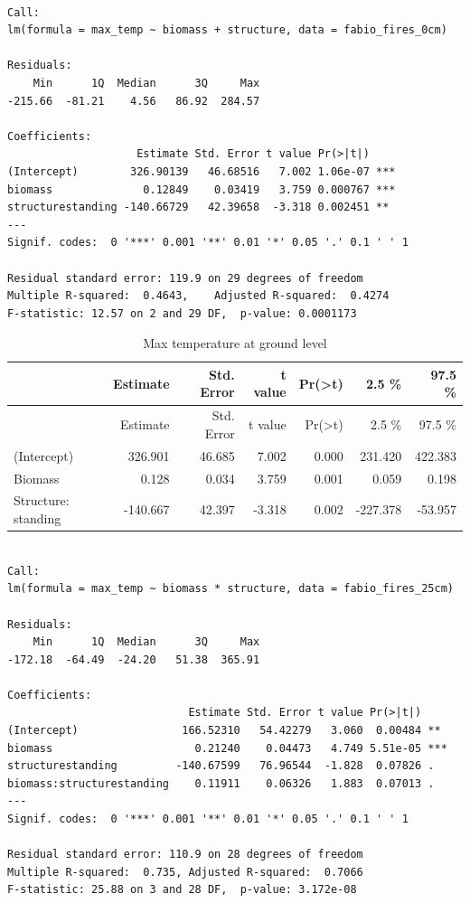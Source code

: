 \documentclass[11pt,a4paper]{article}
\begin{document}
\begin{verbatim}

Call:
lm(formula = max_temp ~ biomass + structure, data = fabio_fires_0cm)

Residuals:
    Min      1Q  Median      3Q     Max 
-215.66  -81.21    4.56   86.92  284.57 

Coefficients:
                    Estimate Std. Error t value Pr(>|t|)    
(Intercept)        326.90139   46.68516   7.002 1.06e-07 ***
biomass              0.12849    0.03419   3.759 0.000767 ***
structurestanding -140.66729   42.39658  -3.318 0.002451 ** 
---
Signif. codes:  0 '***' 0.001 '**' 0.01 '*' 0.05 '.' 0.1 ' ' 1

Residual standard error: 119.9 on 29 degrees of freedom
Multiple R-squared:  0.4643,    Adjusted R-squared:  0.4274 
F-statistic: 12.57 on 2 and 29 DF,  p-value: 0.0001173
\end{verbatim}

\begin{longtable}[]{@{}lrrrrrr@{}}
\caption{Max temperature at ground level}\tabularnewline
\toprule
& Estimate & Std. Error & t value &
Pr(\textgreater{}\textbar{}t\textbar{}) & 2.5 \% & 97.5
\%\tabularnewline
\midrule
\endfirsthead
\toprule
& Estimate & Std. Error & t value &
Pr(\textgreater{}\textbar{}t\textbar{}) & 2.5 \% & 97.5
\%\tabularnewline
\midrule
\endhead
(Intercept) & 326.901 & 46.685 & 7.002 & 0.000 & 231.420 &
422.383\tabularnewline
Biomass & 0.128 & 0.034 & 3.759 & 0.001 & 0.059 & 0.198\tabularnewline
Structure: standing & -140.667 & 42.397 & -3.318 & 0.002 & -227.378 &
-53.957\tabularnewline
\bottomrule
\end{longtable}

\begin{verbatim}

Call:
lm(formula = max_temp ~ biomass * structure, data = fabio_fires_25cm)

Residuals:
    Min      1Q  Median      3Q     Max 
-172.18  -64.49  -24.20   51.38  365.91 

Coefficients:
                            Estimate Std. Error t value Pr(>|t|)    
(Intercept)                166.52310   54.42279   3.060  0.00484 ** 
biomass                      0.21240    0.04473   4.749 5.51e-05 ***
structurestanding         -140.67599   76.96544  -1.828  0.07826 .  
biomass:structurestanding    0.11911    0.06326   1.883  0.07013 .  
---
Signif. codes:  0 '***' 0.001 '**' 0.01 '*' 0.05 '.' 0.1 ' ' 1

Residual standard error: 110.9 on 28 degrees of freedom
Multiple R-squared:  0.735, Adjusted R-squared:  0.7066 
F-statistic: 25.88 on 3 and 28 DF,  p-value: 3.172e-08
\end{verbatim}
\end{document}
